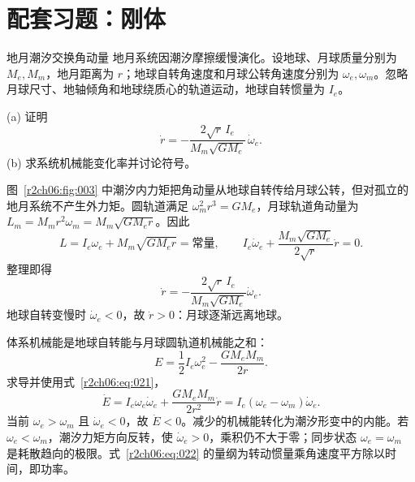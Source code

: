 \section{配套习题：刚体}
\label{r2ch06:sec:practice}

\begin{practicebox}{地月潮汐交换角动量}
地月系统因潮汐摩擦缓慢演化。设地球、月球质量分别为 $M_e,M_m$，地月距离为 $r$；地球自转角速度和月球公转角速度分别为 $\omega_e,\omega_m$。忽略月球尺寸、地轴倾角和地球绕质心的轨道运动，地球自转惯量为 $I_e$。

(a) 证明
\[
 \dot r=-\frac{2\sqrt r\,I_e}{M_m\sqrt{GM_e}}\,\dot\omega_e.
\]
(b) 求系统机械能变化率并讨论符号。
\label{r2ch06:pr:001}
\begin{solution}
图~\ref{r2ch06:fig:003} 中潮汐内力矩把角动量从地球自转传给月球公转，但对孤立的地月系统不产生外力矩。圆轨道满足
$\omega_m^2r^3=GM_e$，月球轨道角动量为
$L_m=M_mr^2\omega_m=M_m\sqrt{GM_er}$。因此
\begin{equation}
 L=I_e\omega_e+M_m\sqrt{GM_er}=\text{常量},
 \qquad
 I_e\dot\omega_e+\frac{M_m\sqrt{GM_e}}{2\sqrt r}\dot r=0.
 \label{r2ch06:eq:020}
\end{equation}
整理即得
\begin{equation}
 \boxed{\dot r=-\frac{2\sqrt r\,I_e}{M_m\sqrt{GM_e}}\dot\omega_e}.
 \label{r2ch06:eq:021}
\end{equation}
地球自转变慢时 $\dot\omega_e<0$，故 $\dot r>0$：月球逐渐远离地球。

体系机械能是地球自转能与月球圆轨道机械能之和：
\[
 E=\frac12I_e\omega_e^2-\frac{GM_eM_m}{2r}.
\]
求导并使用式~\eqref{r2ch06:eq:021}，
\begin{equation}
 \boxed{\dot E=I_e\omega_e\dot\omega_e
 +\frac{GM_eM_m}{2r^2}\dot r
 =I_e(\omega_e-\omega_m)\dot\omega_e}.
 \label{r2ch06:eq:022}
\end{equation}
当前 $\omega_e>\omega_m$ 且 $\dot\omega_e<0$，故 $\dot E<0$。减少的机械能转化为潮汐形变中的内能。若 $\omega_e<\omega_m$，潮汐力矩方向反转，使 $\dot\omega_e>0$，乘积仍不大于零；同步状态 $\omega_e=\omega_m$ 是耗散趋向的极限。式~\eqref{r2ch06:eq:022} 的量纲为转动惯量乘角速度平方除以时间，即功率。
\rTwoChSixEarthMoon
\end{solution}
\end{practicebox}

